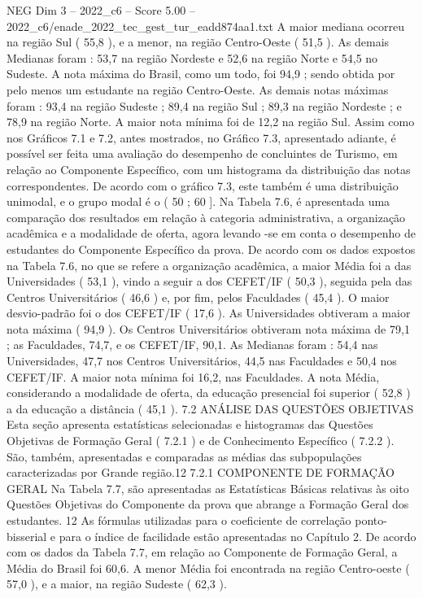 \begin{textsample}{NEG Dim 3 – 2022\_c6 – Score 5.00 – 2022\_c6/enade\_2022\_tec\_gest\_tur\_eadd874aa1.txt}
A maior mediana ocorreu na região Sul ( 55,8 ), e a menor, na região Centro-Oeste ( 51,5 ).
As demais Medianas foram : 53,7 na região Nordeste e 52,6 na região Norte e 54,5 no Sudeste.
A nota máxima do Brasil, como um todo, foi 94,9 ; sendo obtida por pelo menos um estudante na região Centro-Oeste.
As demais notas máximas foram : 93,4 na região Sudeste ; 89,4 na região Sul ; 89,3 na região Nordeste ; e 78,9 na região Norte.
A maior nota mínima foi de 12,2 na região Sul.
Assim como nos Gráficos 7.1 e 7.2, antes mostrados, no Gráfico 7.3, apresentado adiante, é possível ser feita uma avaliação do desempenho de concluintes de Turismo, em relação ao Componente Específico, com um histograma da distribuição das notas correspondentes.
De acordo com o gráfico 7.3, este também é uma distribuição unimodal, e o grupo modal é o ( 50 ; 60 ].
Na Tabela 7.6, é apresentada uma comparação dos resultados em relação à categoria administrativa, a organização acadêmica e a modalidade de oferta, agora levando -se em conta o desempenho de estudantes do Componente Específico da prova.
De acordo com os dados expostos na Tabela 7.6, no que se refere a organização acadêmica, a maior Média foi a das Universidades ( 53,1 ), vindo a seguir a dos CEFET/IF ( 50,3 ), seguida pela das Centros Universitários ( 46,6 ) e, por fim, pelos Faculdades ( 45,4 ).
O maior desvio-padrão foi o dos CEFET/IF ( 17,6 ).
As Universidades obtiveram a maior nota máxima ( 94,9 ).
Os Centros Universitários obtiveram nota máxima de 79,1 ; as Faculdades, 74,7, e os CEFET/IF, 90,1.
As Medianas foram : 54,4 nas Universidades, 47,7 nos Centros Universitários, 44,5 nas Faculdades e 50,4 nos CEFET/IF.
A maior nota mínima foi 16,2, nas Faculdades.
A nota Média, considerando a modalidade de oferta, da educação presencial foi superior ( 52,8 ) a da educação a distância ( 45,1 ). 7.2 ANÁLISE DAS QUESTÕES OBJETIVAS Esta seção apresenta estatísticas selecionadas e histogramas das Questões Objetivas de Formação Geral ( 7.2.1 ) e de Conhecimento Específico ( 7.2.2 ).
São, também, apresentadas e comparadas as médias das subpopulações caracterizadas por Grande região.12 7.2.1 COMPONENTE DE FORMAÇÃO GERAL Na Tabela 7.7, são apresentadas as Estatísticas Básicas relativas às oito Questões Objetivas do Componente da prova que abrange a Formação Geral dos estudantes. 12 As fórmulas utilizadas para o coeficiente de correlação ponto-bisserial e para o índice de facilidade estão apresentadas no Capítulo 2.
De acordo com os dados da Tabela 7.7, em relação ao Componente de Formação Geral, a Média do Brasil foi 60,6.
A menor Média foi encontrada na região Centro-oeste ( 57,0 ), e a maior, na região Sudeste ( 62,3 ).

\end{textsample}
